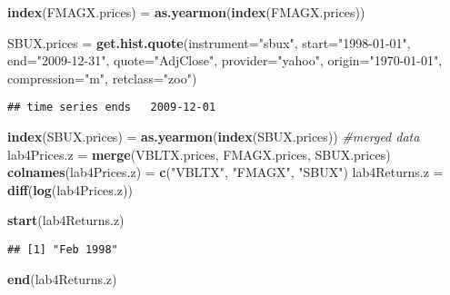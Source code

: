 \documentclass[]{article}
\newenvironment{Shaded}{\begin{snugshade}}{\end{snugshade}}
\newcommand{\KeywordTok}[1]{\textcolor[rgb]{0.13,0.29,0.53}{\textbf{#1}}}
\newcommand{\DataTypeTok}[1]{\textcolor[rgb]{0.13,0.29,0.53}{#1}}
\newcommand{\StringTok}[1]{\textcolor[rgb]{0.31,0.60,0.02}{#1}}
\newcommand{\CommentTok}[1]{\textcolor[rgb]{0.56,0.35,0.01}{\textit{#1}}}
\newcommand{\NormalTok}[1]{#1}
\begin{document}
\begin{Shaded}
\begin{Highlighting}[]
\KeywordTok{index}\NormalTok{(FMAGX.prices) =}\StringTok{ }\KeywordTok{as.yearmon}\NormalTok{(}\KeywordTok{index}\NormalTok{(FMAGX.prices))}

\NormalTok{SBUX.prices =}\StringTok{ }\KeywordTok{get.hist.quote}\NormalTok{(}\DataTypeTok{instrument=}\StringTok{"sbux"}\NormalTok{, }\DataTypeTok{start=}\StringTok{"1998-01-01"}\NormalTok{,}
                             \DataTypeTok{end=}\StringTok{"2009-12-31"}\NormalTok{, }\DataTypeTok{quote=}\StringTok{"AdjClose"}\NormalTok{,}
                             \DataTypeTok{provider=}\StringTok{"yahoo"}\NormalTok{, }\DataTypeTok{origin=}\StringTok{"1970-01-01"}\NormalTok{,}
                             \DataTypeTok{compression=}\StringTok{"m"}\NormalTok{, }\DataTypeTok{retclass=}\StringTok{"zoo"}\NormalTok{)}
\end{Highlighting}
\end{Shaded}

\begin{verbatim}
## time series ends   2009-12-01
\end{verbatim}

\begin{Shaded}
\begin{Highlighting}[]
\KeywordTok{index}\NormalTok{(SBUX.prices) =}\StringTok{ }\KeywordTok{as.yearmon}\NormalTok{(}\KeywordTok{index}\NormalTok{(SBUX.prices))}
\CommentTok{#merged data}
\NormalTok{lab4Prices.z =}\StringTok{ }\KeywordTok{merge}\NormalTok{(VBLTX.prices, FMAGX.prices, SBUX.prices)}
\KeywordTok{colnames}\NormalTok{(lab4Prices.z) =}\StringTok{ }\KeywordTok{c}\NormalTok{(}\StringTok{"VBLTX"}\NormalTok{, }\StringTok{"FMAGX"}\NormalTok{, }\StringTok{"SBUX"}\NormalTok{)}
\NormalTok{lab4Returns.z =}\StringTok{ }\KeywordTok{diff}\NormalTok{(}\KeywordTok{log}\NormalTok{(lab4Prices.z))}

\KeywordTok{start}\NormalTok{(lab4Returns.z)}
\end{Highlighting}
\end{Shaded}

\begin{verbatim}
## [1] "Feb 1998"
\end{verbatim}

\begin{Shaded}
\begin{Highlighting}[]
\KeywordTok{end}\NormalTok{(lab4Returns.z)}
\end{Highlighting}
\end{Shaded}
\end{document}

